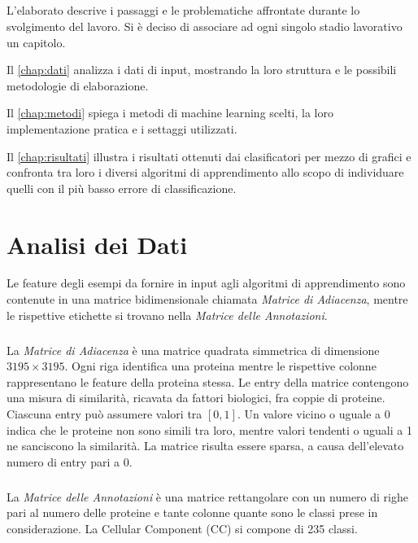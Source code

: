 \documentclass[12pt,a4paper,oneside,hidelinks]{report}
\begin{document}
\paragraph*{}
L'elaborato descrive i passaggi e le problematiche affrontate durante lo svolgimento del lavoro. Si è deciso di associare ad ogni singolo stadio lavorativo un capitolo. 

Il \autoref{chap:dati} analizza i dati di input, mostrando la loro struttura e le possibili metodologie di elaborazione. 

Il \autoref{chap:metodi} spiega i metodi di machine learning scelti, la loro implementazione pratica e i settaggi utilizzati.

Il \autoref{chap:risultati} illustra i risultati ottenuti dai clasificatori per mezzo di grafici e confronta tra loro i diversi algoritmi di apprendimento allo scopo di individuare quelli con il più basso errore di classificazione.

\chapter{Analisi dei Dati} 
\label{chap:dati}
Le feature degli esempi da fornire in input agli algoritmi di apprendimento sono contenute in una matrice bidimensionale chiamata \textit{Matrice di Adiacenza}, mentre le rispettive etichette si trovano nella \textit{Matrice delle Annotazioni}.

\paragraph*{}
La \textit{Matrice di Adiacenza} è una matrice quadrata simmetrica di dimensione $3195 \times 3195$. Ogni riga identifica una proteina mentre le rispettive colonne rappresentano le feature della proteina stessa. Le entry della matrice contengono una misura di similarità, ricavata da fattori biologici, fra coppie di proteine.
Ciascuna entry può assumere valori tra $[0,1]$. Un valore vicino o uguale a 0 indica che le proteine non sono simili tra loro, mentre valori tendenti o uguali a 1 ne sanciscono la similarità. 
La matrice risulta essere sparsa, a causa dell'elevato numero di entry pari a 0.

\paragraph*{}
La \textit{Matrice delle Annotazioni} è una matrice rettangolare con un numero di righe pari al numero delle proteine e tante colonne quante sono le classi prese in considerazione. La Cellular Component (CC) si compone di 235 classi.
\end{document}
